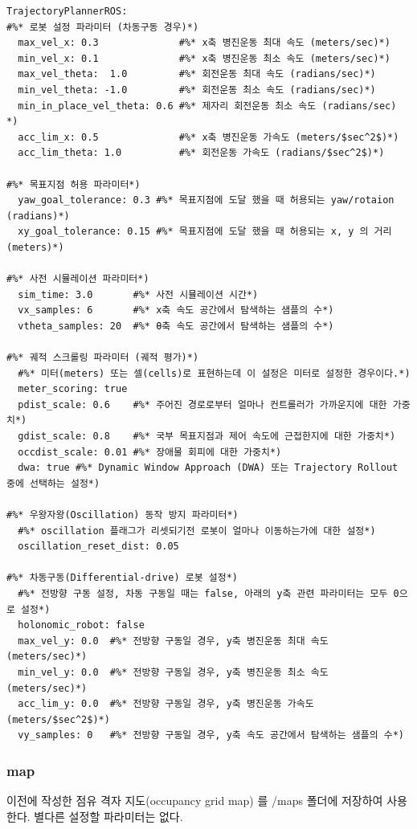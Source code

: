\vspace{\baselineskip}
\begin{lstlisting}[language=ROS]
TrajectoryPlannerROS:
#%* 로봇 설정 파라미터 (차동구동 경우)*)
  max_vel_x: 0.3              #%* x축 병진운동 최대 속도 (meters/sec)*)
  min_vel_x: 0.1              #%* x축 병진운동 최소 속도 (meters/sec)*)
  max_vel_theta:  1.0         #%* 회전운동 최대 속도 (radians/sec)*)
  min_vel_theta: -1.0         #%* 회전운동 최소 속도 (radians/sec)*)
  min_in_place_vel_theta: 0.6 #%* 제자리 회전운동 최소 속도 (radians/sec) *)
  acc_lim_x: 0.5              #%* x축 병진운동 가속도 (meters/$sec^2$)*)
  acc_lim_theta: 1.0          #%* 회전운동 가속도 (radians/$sec^2$)*)

#%* 목표지점 허용 파라미터*)
  yaw_goal_tolerance: 0.3 #%* 목표지점에 도달 했을 때 허용되는 yaw/rotaion (radians)*)
  xy_goal_tolerance: 0.15 #%* 목표지점에 도달 했을 때 허용되는 x, y 의 거리 (meters)*)

#%* 사전 시뮬레이션 파라미터*)
  sim_time: 3.0       #%* 사전 시뮬레이션 시간*)
  vx_samples: 6       #%* x축 속도 공간에서 탐색하는 샘플의 수*)
  vtheta_samples: 20  #%* θ축 속도 공간에서 탐색하는 샘플의 수*)

#%* 궤적 스크롤링 파라미터 (궤적 평가)*)
  #%* 미터(meters) 또는 셀(cells)로 표현하는데 이 설정은 미터로 설정한 경우이다.*)
  meter_scoring: true 
  pdist_scale: 0.6    #%* 주어진 경로로부터 얼마나 컨트롤러가 가까운지에 대한 가중치*)
  gdist_scale: 0.8    #%* 국부 목표지점과 제어 속도에 근접한지에 대한 가중치*)
  occdist_scale: 0.01 #%* 장애물 회피에 대한 가중치*)
  dwa: true #%* Dynamic Window Approach (DWA) 또는 Trajectory Rollout 중에 선택하는 설정*)

#%* 우왕자왕(Oscillation) 동작 방지 파라미터*)
  #%* oscillation 플래그가 리셋되기전 로봇이 얼마나 이동하는가에 대한 설정*)
  oscillation_reset_dist: 0.05 

#%* 차동구동(Differential-drive) 로봇 설정*)
  #%* 전방향 구동 설정, 차동 구동일 때는 false, 아래의 y축 관련 파라미터는 모두 0으로 설정*)
  holonomic_robot: false 
  max_vel_y: 0.0  #%* 전방향 구동일 경우, y축 병진운동 최대 속도 (meters/sec)*)
  min_vel_y: 0.0  #%* 전방향 구동일 경우, y축 병진운동 최소 속도 (meters/sec)*)
  acc_lim_y: 0.0  #%* 전방향 구동일 경우, y축 병진운동 가속도 (meters/$sec^2$)*)
  vy_samples: 0   #%* 전방향 구동일 경우, y축 속도 공간에서 탐색하는 샘플의 수*)
\end{lstlisting}

\subsubsection{map}
이전에 작성한 점유 격자 지도(occupancy grid map) 를 /maps 폴더에 저장하여 사용한다. 별다른 설정할 파라미터는 없다.

